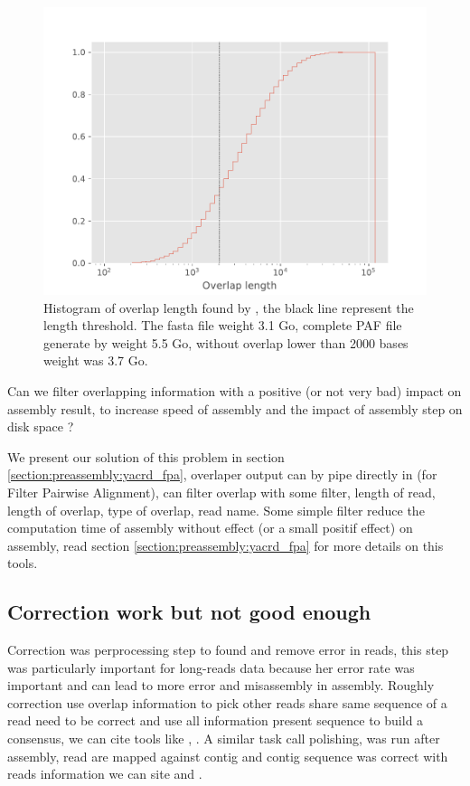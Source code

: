 \documentclass[./main.tex]{subfiles}
\begin{document}
\begin{figure}
    \centering
    \includegraphics[width=\textwidth]{introduction/images/overlap_length.pdf}
    \caption{Histogram of overlap length found by \minimap, the black line represent the \miniasm length threshold. The fasta file weight 3.1 Go, complete PAF file generate by \minimap weight 5.5 Go, without overlap lower than 2000 bases weight was 3.7 Go.}
    \label{intro:fig:length_overlap_histogram}
\end{figure}

Can we filter overlapping information with a positive (or not very bad) impact on assembly result, to increase speed of assembly and the impact of assembly step on disk space ?

We present our solution of this problem \fpa in section \ref{section:preassembly:yacrd_fpa}, overlaper output can by pipe directly in \fpa (for Filter Pairwise Alignment), \fpa can filter overlap with some filter, length of read, length of overlap, type of overlap, read name. Some simple \fpa filter reduce the computation time of assembly without effect (or a small positif effect) on assembly, read section \ref{section:preassembly:yacrd_fpa} for more details on this tools.

\subsection{Correction work but not good enough}

Correction was perprocessing step to found and remove error in reads, this step was particularly important for long-reads data because her error rate was important and can lead to more error and misassembly in assembly. Roughly correction use overlap information to pick other reads share same sequence of a read need to be correct and use all information present sequence to build a consensus, we can cite tools like \cite{MECAT}, \cite{CONSENT}. A similar task call polishing, was run after assembly, read are mapped against contig and contig sequence was correct with reads information we can site \cite{racon} and .
\end{document}
